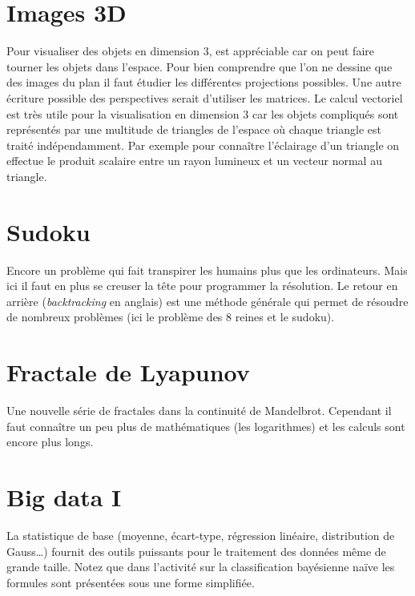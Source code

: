 \documentclass[11pt,class=report,crop=false]{standalone}
\begin{document}
\section{Images 3D}

Pour visualiser des objets en dimension $3$,  est appréciable car on peut faire tourner les objets dans l'espace. Pour bien comprendre que l'on ne dessine que des images du plan il faut étudier les différentes projections possibles. Une autre écriture possible des perspectives serait d'utiliser les matrices. Le calcul vectoriel est très utile pour la visualisation en dimension $3$ car les objets compliqués sont représentés par une multitude de triangles de l'espace où chaque triangle est traité indépendamment. Par exemple pour connaître l'éclairage d'un triangle on effectue le produit scalaire entre un rayon lumineux et un vecteur normal au triangle.


\section{Sudoku}

Encore un problème qui fait transpirer les humains plus que les ordinateurs.
Mais ici il faut en plus se creuser la tête pour programmer la résolution. Le \og{}retour en arrière\fg{} (\emph{backtracking} en anglais) est une méthode générale qui permet de résoudre de nombreux problèmes (ici le problème des $8$ reines et le sudoku). 


\section{Fractale de Lyapunov}

Une nouvelle série de fractales dans la continuité de Mandelbrot. Cependant il faut connaître un peu plus de mathématiques (les logarithmes) et les calculs sont encore plus longs.

\section{Big data I}

La statistique de base (moyenne, écart-type, régression linéaire, distribution de Gauss\ldots) fournit des outils puissants pour le traitement des données même de grande taille. Notez que dans l'activité sur la classification bayésienne naïve les formules sont présentées sous une forme simplifiée.
\end{document}
